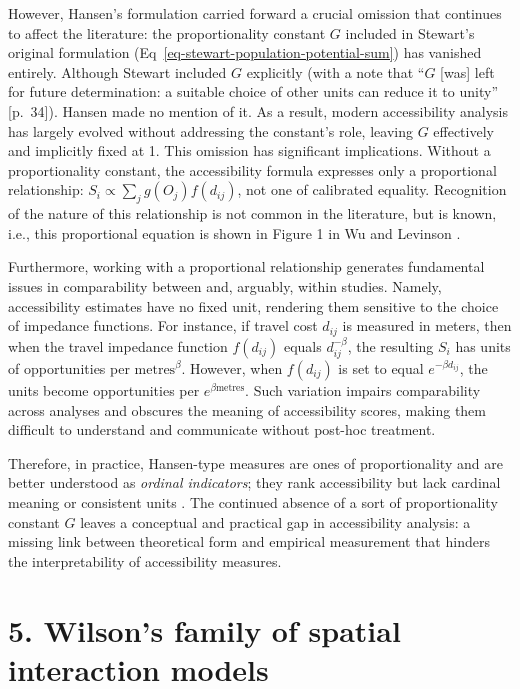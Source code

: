 \documentclass[
  10pt,
  letterpaper,
]{article}
\begin{document}
However, Hansen's formulation carried forward a crucial omission that
continues to affect the literature: the proportionality constant \(G\)
included in Stewart's original formulation
(Eq~\ref{eq-stewart-population-potential-sum}) has vanished entirely.
Although Stewart included \(G\) explicitly (with a note that ``\(G\)
{[}was{]} left for future determination: a suitable choice of other
units can reduce it to unity'' {[}p.~34{]}). Hansen made no mention of
it. As a result, modern accessibility analysis has largely evolved
without addressing the constant's role, leaving \(G\) effectively and
implicitly fixed at 1. This omission has significant implications.
Without a proportionality constant, the accessibility formula expresses
only a proportional relationship:
\(S_i \propto \sum_j g(O_j)f(d_{ij})\), not one of calibrated equality.
Recognition of the nature of this relationship is not common in the
literature, but is known, i.e., this proportional equation is shown in
Figure 1 in Wu and Levinson \citep{wuUnifyingAccess2020}.

Furthermore, working with a proportional relationship generates
fundamental issues in comparability between and, arguably, within
studies. Namely, accessibility estimates have no fixed unit, rendering
them sensitive to the choice of impedance functions. For instance, if
travel cost \(d_{ij}\) is measured in meters, then when the travel
impedance function \(f(d_{ij})\) equals \(d_{ij}^{-\beta}\), the
resulting \(S_i\) has units of opportunities per
\(\text{metres}^{\beta}\). However, when \(f(d_{ij})\) is set to equal
\(e^{-\beta d_{ij}}\), the units become opportunities per
\(e^{\beta \text{metres}}\). Such variation impairs comparability across
analyses and obscures the meaning of accessibility scores, making them
difficult to understand and communicate without post-hoc treatment.

Therefore, in practice, Hansen-type measures are ones of proportionality
and are better understood as \emph{ordinal indicators}; they rank
accessibility but lack cardinal meaning or consistent units
\citep{millerAccessibilityMeasurementApplication2018}. The continued
absence of a sort of proportionality constant \(G\) leaves a conceptual
and practical gap in accessibility analysis: a missing link between
theoretical form and empirical measurement that hinders the
interpretability of accessibility measures.

\section{5. Wilson's family of spatial interaction
models}\label{wilsons-family-of-spatial-interaction-models}
\end{document}
